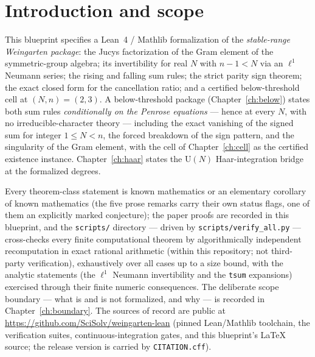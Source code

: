 \chapter{Introduction and scope}\label{ch:intro}

This blueprint specifies a Lean~4 / Mathlib formalization of the
\emph{stable-range Weingarten package}: the Jucys factorization of the Gram
element of the symmetric-group algebra; its invertibility for real $N$ with
$n-1<N$ via an $\ell^1$ Neumann series; the rising and falling sum rules;
the strict parity sign theorem; the exact closed form for the cancellation
ratio; and a certified below-threshold cell at $(N,n)=(2,3)$. A
below-threshold package (Chapter~\ref{ch:below}) states both sum rules
\emph{conditionally on the Penrose equations} --- hence at every $N$, with
no irreducible-character theory --- including the exact vanishing of the signed sum
for integer $1\le N<n$, the forced breakdown of the sign pattern, and the
singularity of the Gram element, with the cell of Chapter~\ref{ch:cell}
as the certified existence instance. Chapter~\ref{ch:haar} states the
$\mathrm U(N)$ Haar-integration bridge at the formalized degrees.

Every theorem-class statement is known mathematics or an elementary corollary
of known mathematics (the five prose remarks carry their own status flags, one
of them an explicitly marked conjecture); the paper proofs are recorded in this blueprint, and the
\texttt{scripts/} directory --- driven by \texttt{scripts/verify\_all.py} ---
cross-checks every finite computational theorem by algorithmically
independent recomputation in exact rational arithmetic (within this
repository; not third-party verification),
exhaustively over all cases up to a size bound, with the analytic
statements (the $\ell^1$ Neumann invertibility and the \texttt{tsum} expansions)
exercised through their finite numeric consequences. The deliberate scope
boundary --- what is and is not formalized, and why --- is recorded in
Chapter~\ref{ch:boundary}. The sources of record are public at
\url{https://github.com/SciSolv/weingarten-lean} (pinned Lean/Mathlib
toolchain, the verification suites, continuous-integration gates, and
this blueprint's \LaTeX{} source; the release version is carried by
\texttt{CITATION.cff}).


